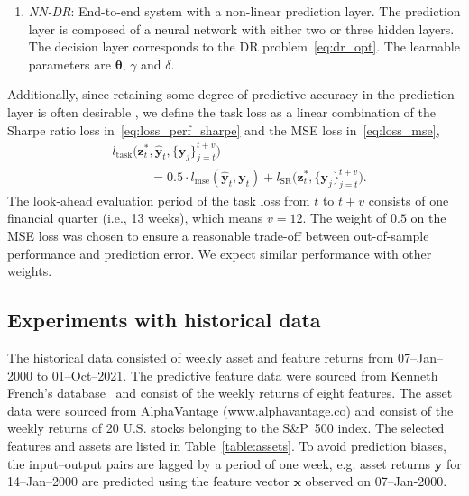 \documentclass[10pt, twocolumn]{article}
\theoremstyle{plain}
\theoremstyle{definition}
\begin{document}
\begin{enumerate}[itemsep=-0.15em, topsep=0pt, leftmargin=*]
\item \emph{NN-DR}: End-to-end system with a non-linear prediction layer. 
  The prediction layer is composed of a neural network with either two or 
  three hidden layers. The decision layer corresponds to the DR 
  problem~\eqref{eq:dr_opt}. The learnable parameters are \(\bm{\theta}\), 
  \(\gamma\) and \(\delta\).
  
\end{enumerate}

Additionally, since retaining some degree of predictive accuracy in the 
prediction layer is often desirable \citep{donti2017task}, we define the task 
loss as a linear combination of the Sharpe ratio loss 
in~\eqref{eq:loss_perf_sharpe} and the MSE loss in~\eqref{eq:loss_mse},
\begin{align}
    &l_{\text{task}}\big(\bm{z}_{t}^*, \hat{\bm{y}}_t, 
    \{\bm{y}_j\}_{j=t}^{t+v}\big)\nonumber\\
    &\qquad\quad = 0.5\cdot l_{\text{mse}}(\hat{\bm{y}}_t, \bm{y}_{t}) 
    + l_{\text{SR}}\big(\bm{z}_{t}^*, \{\bm{y}_j\}_{j=t}^{t+v}\big).\nonumber
\end{align}
The look-ahead evaluation period of the task loss from \(t\) to \(t+v\)
consists of one financial quarter (i.e., 13 weeks), which means
\(v=12\). The weight of \(0.5\) on the MSE loss was chosen to ensure
a reasonable trade-off between out-of-sample performance and prediction 
error. We expect similar performance with other weights.

\subsection{Experiments with historical data}\label{sec:exp_hist}

The historical data consisted of weekly asset and feature returns from 
07--Jan--2000 to 01--Oct--2021. The predictive feature data were sourced 
from Kenneth French's database~\citep{French2021Data} and consist of the 
weekly returns of eight features. The asset data were sourced from AlphaVantage
(www.alphavantage.co) and consist of the weekly returns of 20 U.S. stocks 
belonging to the S\&P~500 index. The selected features and assets are listed in 
Table~\ref{table:assets}. To avoid prediction biases, the input--output pairs 
are lagged by a period of one week, e.g. asset returns \(\bm{y}\)
for 14--Jan--2000 are predicted using the feature vector \(\bm{x}\) observed
on 07--Jan-2000.
\end{document}
